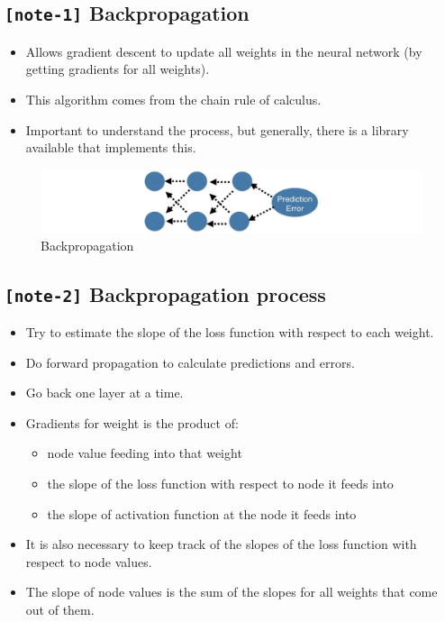 \documentclass[11pt, twoside]{article}
\begin{document}
    \hypertarget{note-1-backpropagation}{%
\subsection{\texorpdfstring{\texttt{{[}note-1{]}}
Backpropagation}{{[}note-1{]} Backpropagation}}\label{note-1-backpropagation}}

\begin{itemize}
\item
  Allows gradient descent to update all weights in the neural network
  (by getting gradients for all weights).
\item
  This algorithm comes from the chain rule of calculus.
\item
  Important to understand the process, but generally, there is a library
  available that implements this.
\end{itemize}

\begin{figure}
\centering
\includegraphics{../Figures/10. Backpropagation.jpg}
\caption{Backpropagation}
\end{figure}

    \hypertarget{note-2-backpropagation-process}{%
\subsection{\texorpdfstring{\texttt{{[}note-2{]}} Backpropagation
process}{{[}note-2{]} Backpropagation process}}\label{note-2-backpropagation-process}}

\begin{itemize}
\item
  Try to estimate the slope of the loss function with respect to each
  weight.
\item
  Do forward propagation to calculate predictions and errors.
\item
  Go back one layer at a time.
\item
  Gradients for weight is the product of:

  \begin{itemize}
  \item
    node value feeding into that weight
  \item
    the slope of the loss function with respect to node it feeds into
  \item
    the slope of activation function at the node it feeds into
  \end{itemize}
\item
  It is also necessary to keep track of the slopes of the loss function
  with respect to node values.
\item
  The slope of node values is the sum of the slopes for all weights that
  come out of them.
\end{itemize}
\end{document}
